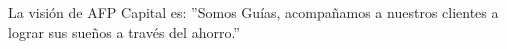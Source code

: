La visión de AFP Capital es: ''Somos Guías, acompañamos a nuestros clientes a lograr sus sueños a través del ahorro.'' \cite{afpcapital}